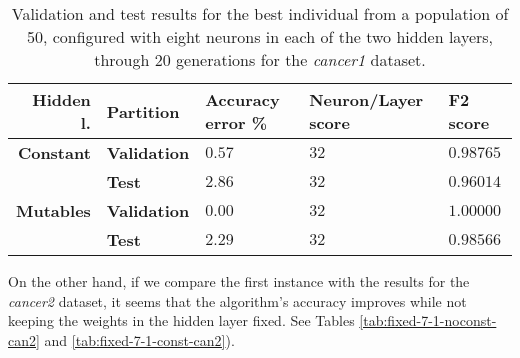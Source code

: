 \documentclass[runningheads]{llncs}
\begin{document}
\begin{table}
    \centering
    \caption{
Validation and test results for the best individual from a population of 50,
configured with eight neurons in each of the two hidden layers, through 20
generations for the \emph{cancer1} dataset.}
     \label{tab:fixed-8-2-comp-can1}
     \begin{tabular}{rllll}
         \textbf{Hidden l.} & \textbf{Partition}  & \textbf{Accuracy error \%} & \textbf{Neuron/Layer score} & \textbf{F2 score} \\
         \hline
         \textbf{Constant}  & \textbf{Validation} & $0.57$                 &        $32$             &      $0.98765$ \\
                        & \textbf{Test}       & $2.86$                 &        $32$             &      $0.96014$ \\
         \textbf{Mutables}  & \textbf{Validation} & $0.00$                 &        $32$             &      $1.00000$ \\
                        & \textbf{Test}       & $2.29$                 &        $32$             &      $0.98566$ \\
     \end{tabular}
 \end{table}


On the other hand, if we compare the first instance with the results for the
\emph{cancer2} dataset, it seems that the algorithm's accuracy improves while
not keeping the weights in the hidden layer fixed. See Tables
\ref{tab:fixed-7-1-noconst-can2} and \ref{tab:fixed-7-1-const-can2}).
\end{document}
